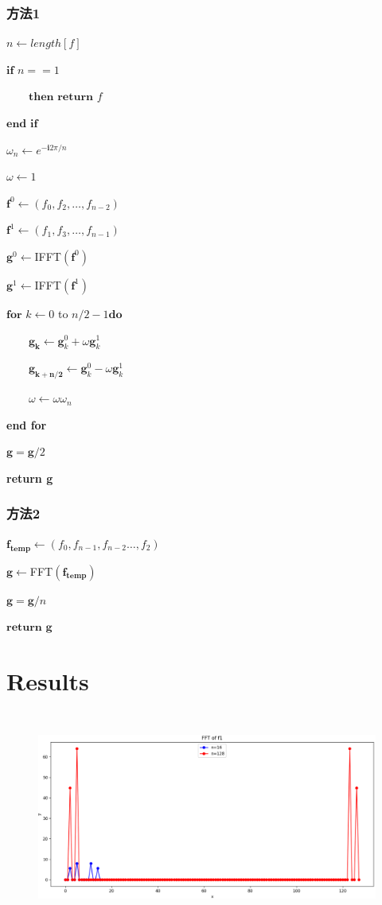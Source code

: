 \documentclass{ctexart}
\begin{document}
	\subsubsection{方法1}

$n\leftarrow length[f]$ 

$\textbf{if }n= = 1$

$\quad\quad\textbf{then return }f$

$\textbf{end if}$

$\omega_n\leftarrow e^{\boldsymbol{-i}2\pi/n}$

$\omega\leftarrow1$

$\mathbf{f}^{0}\leftarrow(f_{0},f_{2},\ldots,f_{n-2})$

$\mathbf{f}^{1}\leftarrow(f_{1},f_{3},\ldots,f_{n-1})$

$\mathbf{g}^0\leftarrow$IFFT$(\mathbf{f}^0)$

$\mathbf{g}^1\leftarrow$IFFT$(\mathbf{f}^1)$ 

$\textbf{for }k\leftarrow 0$ to $n/ 2- 1\textbf{do}$

$\quad\quad\mathbf{g_k}\leftarrow\mathbf{g}_k^0+\omega\mathbf{g}_k^1$

$\quad\quad\mathbf{g_{k+n/2}}\leftarrow\mathbf{g}_k^0-\omega\mathbf{g}_k^1$

$\quad\quad\omega\leftarrow\omega\omega_n$

\textbf{end for}

$\mathbf{g} = \mathbf{g}/2$

\textbf{return g}
\subsubsection{方法2}
$\mathbf{f_{temp}}\leftarrow(f_{0},f_{n-1},f_{n-2}\ldots,f_{2})$

$\mathbf{g}\leftarrow$FFT$(\mathbf{f_{temp}})$

$\mathbf{g} = \mathbf{g}/n$

$\textbf{return g}$
	\section{Results}
	\begin{figure}[H]
		\centering 
		\includegraphics[height=7cm,width=14cm]{1.png}
		\end{figure}
		
\end{document}
